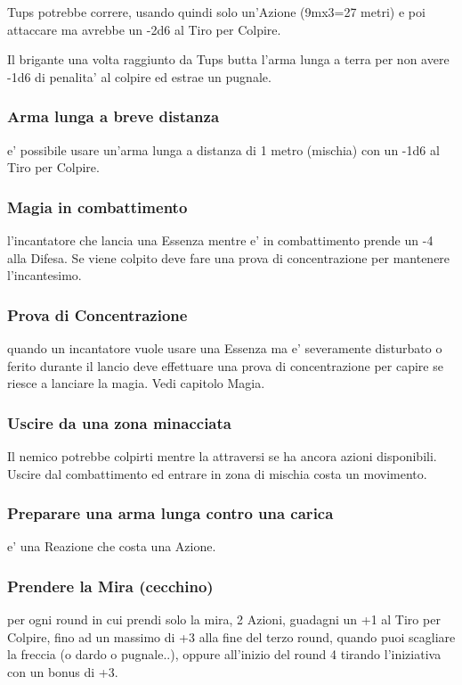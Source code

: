 \documentclass[a4paper,11pt,twoside,openany]{book}
\begin{document}
	Tups potrebbe correre, usando quindi solo un'Azione (9mx3=27 metri) e poi attaccare ma avrebbe un -2d6 al Tiro per Colpire.
	
	Il brigante una volta raggiunto da Tups butta l'arma lunga a terra per non avere -1d6 di penalita' al colpire ed estrae un pugnale.
	
	\subsubsection{Arma lunga a breve distanza} e' possibile usare un'arma lunga a distanza di 1 metro (mischia) con un -1d6 al Tiro per Colpire.
	
	\subsubsection{Magia in combattimento} l'incantatore che lancia una Essenza mentre e' in combattimento prende un -4 alla Difesa. Se viene colpito deve fare una prova di concentrazione per mantenere l'incantesimo.
	
	\subsubsection{Prova di Concentrazione} quando un incantatore vuole usare una Essenza ma e' severamente disturbato o ferito durante il lancio deve effettuare una prova di concentrazione per capire se riesce a lanciare la magia. Vedi capitolo Magia.
	
	\subsubsection{Uscire da una zona minacciata} Il nemico potrebbe colpirti mentre la attraversi se ha ancora azioni disponibili. Uscire dal combattimento ed entrare in zona di mischia costa un movimento.
	
	\subsubsection{Preparare una arma lunga contro una carica} e' una Reazione che costa una Azione.
	
	\subsubsection{Prendere la Mira (cecchino)} per ogni round in cui prendi solo la mira, 2 Azioni, guadagni un +1 al Tiro per Colpire, fino ad un massimo di +3 alla fine del terzo round, quando puoi scagliare la freccia (o dardo o pugnale..), oppure all'inizio del round 4 tirando l'iniziativa con un bonus di +3.
	
\end{document}
